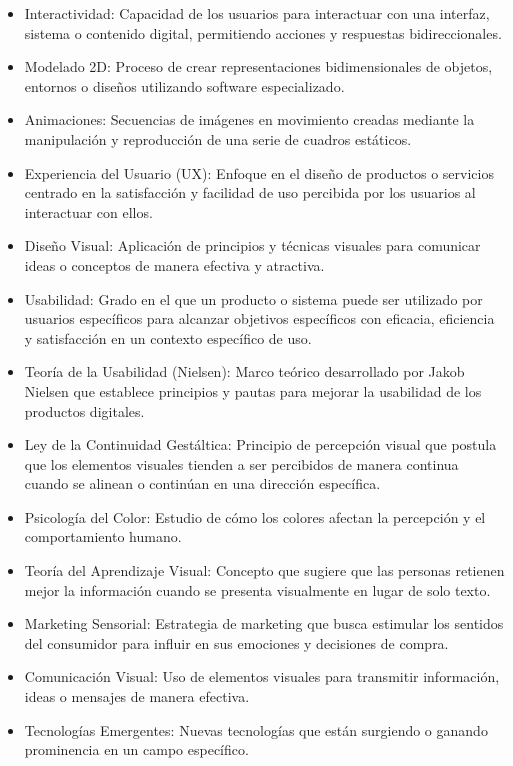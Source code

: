 \begin{itemize}
    \item Interactividad: Capacidad de los usuarios para interactuar con una interfaz, sistema o contenido digital, permitiendo acciones y respuestas bidireccionales.
    \item Modelado 2D: Proceso de crear representaciones bidimensionales de objetos, entornos o diseños utilizando software especializado.
    \item Animaciones: Secuencias de imágenes en movimiento creadas mediante la manipulación y reproducción de una serie de cuadros estáticos.
    \item Experiencia del Usuario (UX): Enfoque en el diseño de productos o servicios centrado en la satisfacción y facilidad de uso percibida por los usuarios al interactuar con ellos. \cite{ferrer2023aplicabilidad}
    \item Diseño Visual: Aplicación de principios y técnicas visuales para comunicar ideas o conceptos de manera efectiva y atractiva.
    \item Usabilidad: Grado en el que un producto o sistema puede ser utilizado por usuarios específicos para alcanzar objetivos específicos con eficacia, eficiencia y satisfacción en un contexto específico de uso.
    \item Teoría de la Usabilidad (Nielsen): Marco teórico desarrollado por Jakob Nielsen que establece principios y pautas para mejorar la usabilidad de los productos digitales. \cite{preciado2023analisis} 
    \item Ley de la Continuidad Gestáltica: Principio de percepción visual que postula que los elementos visuales tienden a ser percibidos de manera continua cuando se alinean o continúan en una dirección específica. \cite{ciafardo2020breviario}
    \item Psicología del Color: Estudio de cómo los colores afectan la percepción y el comportamiento humano. \cite{garcia2023psicologia}
    \item Teoría del Aprendizaje Visual: Concepto que sugiere que las personas retienen mejor la información cuando se presenta visualmente en lugar de solo texto. \cite{penaherrera2023paratextualidad}
    \item Marketing Sensorial: Estrategia de marketing que busca estimular los sentidos del consumidor para influir en sus emociones y decisiones de compra.
    \item Comunicación Visual: Uso de elementos visuales para transmitir información, ideas o mensajes de manera efectiva.
    \item Tecnologías Emergentes: Nuevas tecnologías que están surgiendo o ganando prominencia en un campo específico.
\end{itemize}

